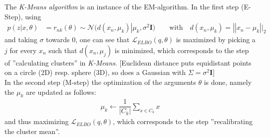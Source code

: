 \documentclass[11pt]{article}
\begin{document}
\noindent The \textit{K-Means algorithm} is an instance of the EM-algorithm. In the first step (E-Step), using
\begin{align*}
	p(z|x,\theta) &= r_{nk}(\theta) \sim \mathcal{N}(d(x_n, \mu_k) | \mu_k, \sigma^2 \boldsymbol{I})
	\quad\quad \text{with}\quad d(x_n, \mu_k) = ||x_n - \mu_k||_2
\end{align*}
and taking $\sigma$ towards $0$, one can see that $\mathcal{L}_{ELBO}(q, \theta)$ is maximized by picking a $j$ for every $x_n$ such that $d(x_n, \mu_j)$ is minimized, which corresponds to the step of ''calculating clusters'' in \textit{K-Means}. [Euclidean distance puts equidistant points on a circle (2D) resp. sphere (3D), so does a Gaussian with $\Sigma = \sigma^2 \boldsymbol{I}$]\\

\noindent In the second step (M-step) the optimization of the arguments $\theta$ is done, namely the $\mu_k$ are updated as follows:
\begin{align*}
	\mu_k \leftarrow \dfrac{1}{|C_k|} \sum_{x \in C_k} x
\end{align*}
and thus maximizing $\mathcal{L}_{ELBO}(q, \theta)$, which corresponds to the step ''recalibrating the cluster mean''.
\end{document}
